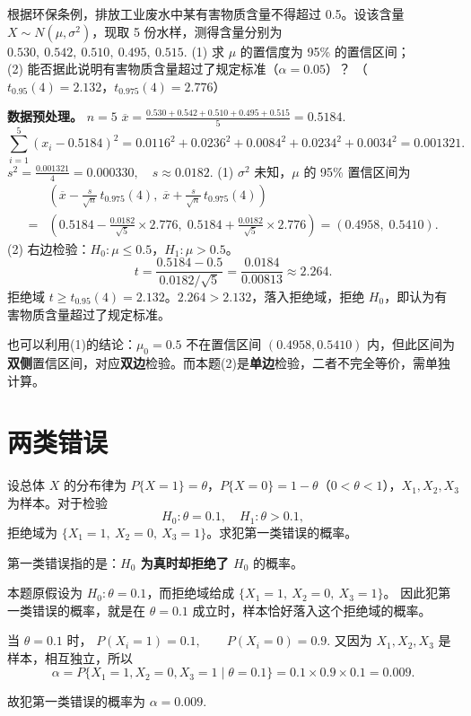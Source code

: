 \documentclass[lang=cn,11pt]{elegantbook}
\begin{document}
\begin{exercise}[置信区间与假设检验的综合] \label{ex:ci_ht_01}
根据环保条例，排放工业废水中某有害物质含量不得超过 0.5。设该含量 \(X\sim N(\mu,\sigma^2)\)，现取 5 份水样，测得含量分别为
\(
0.530,\ 0.542,\ 0.510,\ 0.495,\ 0.515.
\)
(1) 求 \(\mu\) 的置信度为 95\% 的置信区间；\\
(2) 能否据此说明有害物质含量超过了规定标准（\(\alpha=0.05\)）？
（\(t_{0.95}(4)=2.132\)，\(t_{0.975}(4)=2.776\)）
\end{exercise}
\begin{solution}
\textbf{数据预处理。} \(n=5\)
\(
\overline{x}=\frac{0.530+0.542+0.510+0.495+0.515}{5}=0.5184.
\)
\[
\sum_{i=1}^{5}(x_i-0.5184)^2=0.0116^2+0.0236^2+0.0084^2+0.0234^2+0.0034^2=0.001321.
\]
\(
s^2=\frac{0.001321}{4}=0.000330,\quad s\approx 0.0182.
\)
(1) \(\sigma^2\) 未知，\(\mu\) 的 95\% 置信区间为
\begin{align*}
&\left(\overline{x}-\frac{s}{\sqrt{n}}\,t_{0.975}(4),\;\overline{x}+\frac{s}{\sqrt{n}}\,t_{0.975}(4)\right)\\
=&\left(0.5184-\frac{0.0182}{\sqrt{5}}\times2.776,\;0.5184+\frac{0.0182}{\sqrt{5}}\times2.776\right)=(0.4958,\;0.5410).
\end{align*}
(2) 右边检验：\(H_0\colon\mu\leq 0.5\)，\(H_1\colon\mu>0.5\)。
\[
t=\frac{0.5184-0.5}{0.0182/\sqrt{5}}=\frac{0.0184}{0.00813}\approx 2.264.
\]
拒绝域 \(t\geq t_{0.95}(4)=2.132\)。\(2.264>2.132\)，落入拒绝域，拒绝 \(H_0\)，即认为有害物质含量超过了规定标准。
\begin{note}
也可以利用(1)的结论：\(\mu_0=0.5\) 不在置信区间 \((0.4958,0.5410)\) 内，但此区间为\textbf{双侧}置信区间，对应\textbf{双边}检验。而本题(2)是\textbf{单边}检验，二者不完全等价，需单独计算。
\end{note}
\end{solution}


\section{两类错误}


\begin{exercise}[离散总体第一类错误的计算] \label{ex:error_discrete}
设总体 \(X\) 的分布律为 \(P\{X=1\}=\theta\)，\(P\{X=0\}=1-\theta\)（\(0<\theta<1\)），\(X_1,X_2,X_3\) 为样本。对于检验
\[
H_0\colon\theta=0.1,\quad H_1\colon\theta>0.1,
\]
拒绝域为 \(\{X_1=1,\ X_2=0,\ X_3=1\}\)。求犯第一类错误的概率。
\end{exercise}
\begin{solution}
第一类错误指的是：\textbf{\(H_0\) 为真时却拒绝了 \(H_0\)} 的概率。

本题原假设为 \(H_0:\theta=0.1\)，而拒绝域给成 \(\{X_1=1,\ X_2=0,\ X_3=1\}\)。
因此犯第一类错误的概率，就是在 \(\theta=0.1\) 成立时，样本恰好落入这个拒绝域的概率。

当 \(\theta=0.1\) 时，
\(
P(X_i=1)=0.1,\qquad P(X_i=0)=0.9.
\)
又因为 \(X_1,X_2,X_3\) 是样本，相互独立，所以
\[
\alpha=P\{X_1=1,X_2=0,X_3=1\mid\theta=0.1\}=0.1\times0.9\times0.1=0.009.
\]

故犯第一类错误的概率为
\(
\alpha=0.009.
\)
\end{solution}
\end{document}
